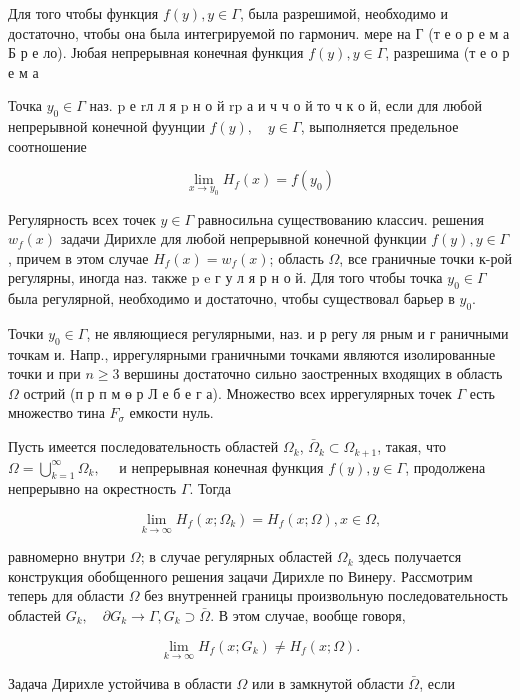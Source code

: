 \documentclass[10pt]{article}
\begin{document}
Для того чтобы функция $f(y), y \in \Gamma$, была разрешимой, необходимо и достаточно, чтобы она была интегрируемой по гармонич. мере на Г (т е о р е м а Б р е ло). Јюбая непрерывная конечная функция $f(y), y \in \Gamma$, разрешима (т е о р е м а

Точка $y_{0} \in \Gamma$ наз. $\mathrm{p}$ е $\mathrm{r} \mathbf{л}$ л я $\mathrm{p}$ н о й $\mathrm{r} \mathrm{p}$ а и ч ч о й то ч к о й, если для любой непрерывной конечной фуунции $f(y), \quad y \in \Gamma$, выполняется предельное соотношение

\[
\lim _{x \rightarrow y_{0}} H_{f}(x)=f\left(y_{0}\right)
\]

Регулярность всех точек $y \in \Gamma$ равносильна существованию классич. решения $w_{f}(x)$ задачи Дирихле для любой непрерывной конечной функции $f(y), y \in \Gamma$, причем в этом случае $H_{f}(x)=w_{f}(x)$; область $\Omega$, все граничные точки к-рой регулярны, иногда наз. также p e г у л я р н о й. Для того чтобы точка $y_{0} \in \Gamma$ была регулярной, необходимо и достаточно, чтобы существовал барьер в $y_{0}$.

Точки $y_{0} \in \Gamma$, не являющиеся регулярными, наз. и р регу ля рным и г раничными точкам и. Напр., иррегулярными граничными точками являются изолированные точки и при $n \geqslant 3$ вершины достаточно сильно заостренных входящих в область $\Omega$ острий (п р п м ө р Л е б е г а). Множество всех иррегулярных точек $\Gamma$ есть множество тина $F_{\sigma}$ емкости нуль.

Пусть имеется последовательность областей $\Omega_{k}$, $\bar{\Omega}_{k} \subset \Omega_{k+1}$, такая, что $\Omega=\bigcup_{k=1}^{\infty} \Omega_{k}, \quad$ и непрерывная конечная функция $f(y), y \in \Gamma$, продолжена непрерывно на окрестность $\Gamma$. Тогда

\[
\lim _{k \rightarrow \infty} H_{f}\left(x ; \Omega_{k}\right)=H_{f}(x ; \Omega), x \in \Omega,
\]

равномерно внутри $\Omega$; в случае регулярных областей $\Omega_{k}$ здесь получается конструкция обобщенного решения зацачи Дирихле по Винеру. Рассмотрим теперь для области $\Omega$ без внутренней границы произвольную последовательность областей $G_{k}, \quad \partial G_{k} \rightarrow \Gamma, G_{k} \supset \bar{\Omega}$. В этом случае, вообще говоря,

\[
\lim _{k \rightarrow \infty} H_{f}\left(x ; G_{k}\right) \neq H_{f}(x ; \Omega) .
\]

Задача Дирихле устойчива в области $\Omega$ или в замкнутой области $\bar{\Omega}$, если
\end{document}
